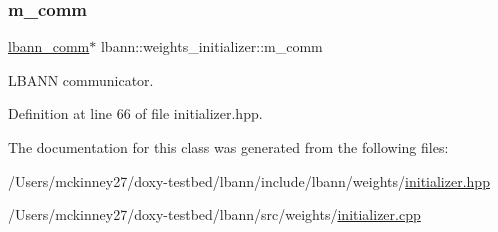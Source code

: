 \subsubsection{\texorpdfstring{m\+\_\+comm}{m\_comm}}
{\footnotesize\ttfamily \hyperlink{classlbann_1_1lbann__comm}{lbann\+\_\+comm}$\ast$ lbann\+::weights\+\_\+initializer\+::m\+\_\+comm\hspace{0.3cm}{\ttfamily [protected]}}

L\+B\+A\+NN communicator. 

Definition at line 66 of file initializer.\+hpp.



The documentation for this class was generated from the following files\+:\begin{DoxyCompactItemize}
\item 
/\+Users/mckinney27/doxy-\/testbed/lbann/include/lbann/weights/\hyperlink{initializer_8hpp}{initializer.\+hpp}\item 
/\+Users/mckinney27/doxy-\/testbed/lbann/src/weights/\hyperlink{initializer_8cpp}{initializer.\+cpp}\end{DoxyCompactItemize}
